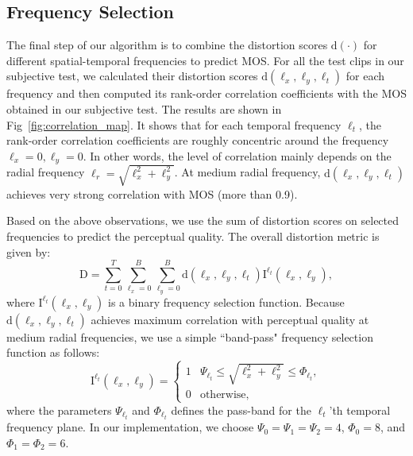 \documentclass{sig-alternate}
\begin{document}
\subsection{Frequency Selection}
The final step of our algorithm is to combine the distortion scores $\mathrm{d}(\cdot)$ for different spatial-temporal frequencies to predict MOS. For all the test clips in our subjective test, we calculated their distortion scores  $\mathrm{d}(\ell_x,\ell_y,\ell_t)$ for each frequency and then computed its rank-order correlation coefficients with the MOS obtained in our subjective test. The results are shown in Fig~\ref{fig:correlation_map}. It shows that for each temporal frequency $\ell_t$, the rank-order correlation coefficients are roughly concentric around the frequency $\ell_x=0,\ell_y=0$. In other words, the level of correlation mainly depends on the radial frequency $\ell_r=\sqrt{\ell_x^2 +\ell_y^2}$. At medium radial frequency, $\mathrm{d}(\ell_x,\ell_y,\ell_t)$ achieves very strong correlation with MOS (more than 0.9).

Based on the above observations, we use the sum of distortion scores on selected frequencies to predict the perceptual quality. The overall distortion metric is given by:
\begin{equation}
\label{eq:final_score}
\mathrm{D} = \sum_{t=0}^T\sum_{\ell_x=0}^{B}\sum_{\ell_y=0}^{B}\mathrm{d}(\ell_x,\ell_y,\ell_t)\mathrm{I}^{\ell_t}(\ell_x,\ell_y),
\end{equation} 
where $\mathrm{I}^{\ell_t}(\ell_x,\ell_y)$ is a binary frequency selection function. Because $\mathrm{d}(\ell_x,\ell_y,\ell_t)$ achieves maximum correlation with perceptual quality at medium radial frequencies, we use a simple ``band-pass" frequency selection function as follows:
\begin{equation}
\label{eq:freqency_selection}
\mathrm{I}^{\ell_t}(\ell_x,\ell_y) =
\begin{cases}
1 & \Psi_{\ell_t}\leq\sqrt{\ell_x^2 +\ell_y^2}\leq \Phi_{\ell_t},\\
0 & \text{otherwise},
\end{cases}
\end{equation}
where the parameters $\Psi_{\ell_t}$ and $\Phi_{\ell_t}$ defines the pass-band for the $\ell_t$'th temporal frequency plane. In our implementation, we choose $\Psi_0=\Psi_1=\Psi_2=4$, $\Phi_0=8$, and $\Phi_1=\Phi_2=6$.
\end{document}
